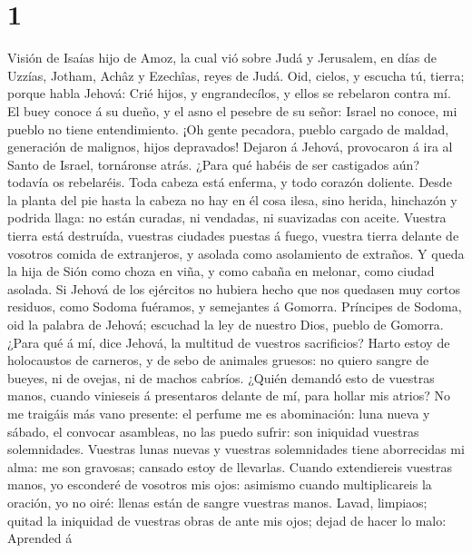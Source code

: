 \hypertarget{section}{%
\section{1}\label{section}}

 Visión de Isaías hijo de Amoz, la cual vió sobre Judá y
Jerusalem, en días de Uzzías, Jotham, Achâz y Ezechîas, reyes de Judá.
 Oid, cielos, y escucha tú, tierra; porque habla Jehová:
Crié hijos, y engrandecílos, y ellos se rebelaron contra mí.
 El buey conoce á su dueño, y el asno el pesebre de su
señor: Israel no conoce, mi pueblo no tiene entendimiento. 
¡Oh gente pecadora, pueblo cargado de maldad, generación de malignos,
hijos depravados! Dejaron á Jehová, provocaron á ira al Santo de Israel,
tornáronse atrás.  ¿Para qué habéis de ser castigados aún?
todavía os rebelaréis. Toda cabeza está enferma, y todo corazón
doliente.  Desde la planta del pie hasta la cabeza no hay en
él cosa ilesa, sino herida, hinchazón y podrida llaga: no están curadas,
ni vendadas, ni suavizadas con aceite.  Vuestra tierra está
destruída, vuestras ciudades puestas á fuego, vuestra tierra delante de
vosotros comida de extranjeros, y asolada como asolamiento de extraños.
 Y queda la hija de Sión como choza en viña, y como cabaña
en melonar, como ciudad asolada.  Si Jehová de los ejércitos
no hubiera hecho que nos quedasen muy cortos residuos, como Sodoma
fuéramos, y semejantes á Gomorra.  Príncipes de Sodoma, oid
la palabra de Jehová; escuchad la ley de nuestro Dios, pueblo de
Gomorra.  ¿Para qué á mí, dice Jehová, la multitud de
vuestros sacrificios? Harto estoy de holocaustos de carneros, y de sebo
de animales gruesos: no quiero sangre de bueyes, ni de ovejas, ni de
machos cabríos.  ¿Quién demandó esto de vuestras manos,
cuando vinieseis á presentaros delante de mí, para hollar mis atrios?
 No me traigáis más vano presente: el perfume me es
abominación: luna nueva y sábado, el convocar asambleas, no las puedo
sufrir: son iniquidad vuestras solemnidades.  Vuestras
lunas nuevas y vuestras solemnidades tiene aborrecidas mi alma: me son
gravosas; cansado estoy de llevarlas.  Cuando extendiereis
vuestras manos, yo esconderé de vosotros mis ojos: asimismo cuando
multiplicareis la oración, yo no oiré: llenas están de sangre vuestras
manos.  Lavad, limpiaos; quitad la iniquidad de vuestras
obras de ante mis ojos; dejad de hacer lo malo:  Aprended á
